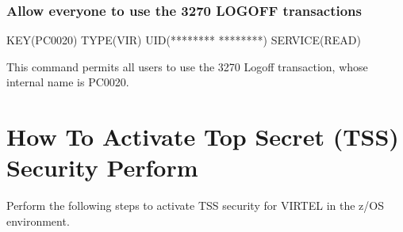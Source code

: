 \documentclass[letterpaper,10pt,english]{sphinxmanual}
\begin{document}
\begin{sphinxVerbatim}[commandchars=\\\{\}]
             
                      
\end{sphinxVerbatim}


\subsubsection{Allow everyone to use the 3270 LOGOFF transactions}
\label{\detokenize{Installation_Guide:allow-everyone-to-use-the-3270-logoff-transactions}}
\begin{sphinxVerbatim}[commandchars=\\\{\}]
\PYGZdl{}KEY(PC\PYGZhy{}0020) TYPE(VIR) UID(******** ********) SERVICE(READ)
\end{sphinxVerbatim}

\sphinxAtStartPar
{}

\sphinxAtStartPar
This command permits all users to use the 3270 Logoff transaction, whose internal name is PC\sphinxhyphen{}0020.

\newpage

\ignorespaces 

\section{How To Activate Top Secret (TSS) Security Perform}
\label{\detokenize{Installation_Guide:how-to-activate-top-secret-tss-security-perform}}\label{\detokenize{Installation_Guide:index-186}}
\sphinxAtStartPar
Perform the following steps to activate TSS security for VIRTEL in the z/OS environment.
\end{document}
